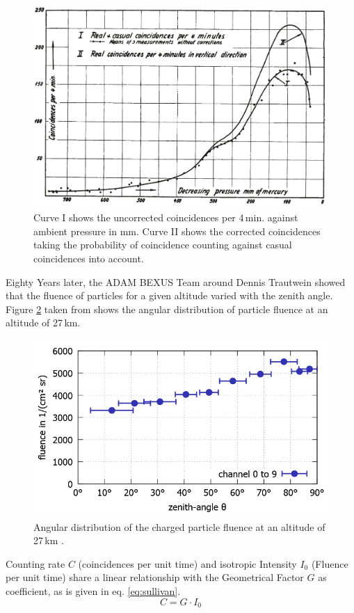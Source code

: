 \begin{figure}[H]
    \centering
    \includegraphics[width=0.8\linewidth]{images/01_background/original_regener_pfotzer.png}
    \caption[Regener-Pfotzer-Maximum as shown in \cite{regener-pfotzer-1935}]{Curve I shows the uncorrected coincidences per 4\,min. against ambient pressure in mm. Curve II shows the corrected coincidences taking the probability of coincidence counting against casual coincidences into account\cite{regener-pfotzer-1935}.}
    \label{fig:regener1935}
\end{figure}

Eighty Years later, the \ac{ADAM} \ac{BEXUS} Team around Dennis Trautwein showed that the fluence of particles for a given altitude varied with the zenith angle. Figure \ref{fig:martensen2015} taken from \cite{martensen2015} shows the angular distribution of particle fluence at an altitude of 27\,km.

\begin{figure}[H]
    \centering
    \includegraphics[width=0.6\linewidth]{images/01_background/martensen.png}
    \caption[Results of \acs{ADAM} at 27\,km]{Angular distribution of the charged particle fluence at an altitude of 27\,km \cite{martensen2015}.}
    \label{fig:martensen2015}
\end{figure}

Counting rate $C$ (coincidences per unit time) and isotropic Intensity $I_0$ (Fluence per unit time) share a linear relationship with the Geometrical Factor $G$ as coefficient, as is given in eq. \eqref{eq:sullivan}\cite{SULLIVAN19715}.
\begin{equation}
    C=G\cdot I_0
    \label{eq:sullivan}
\end{equation}

